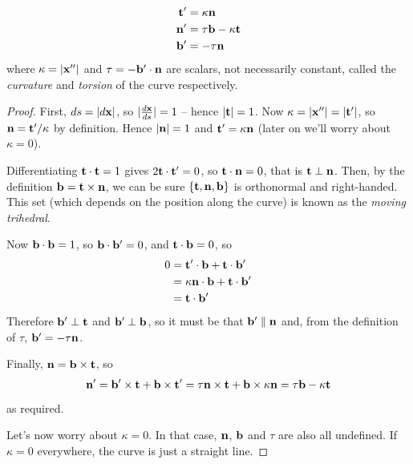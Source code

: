 \documentclass{../template/note}
\begin{document}
    \begin{proposition}
        \begin{align*}
            \V t' &= \kappa \V n \\
            \V n' &= \tau \V b - \kappa \V t \\
            \V b' &= -\tau \V n
        \end{align*}
        where \(\kappa = |\V x''|\) and \(\tau = -\V b' \cdot \V n\) are scalars, not necessarily constant, called the \emph{curvature} and \emph{torsion} of the curve respectively.
    \end{proposition}
    
    \begin{proof}
        First, \(ds = |d \V x|\), so \(|\frac{d \V x}{ds}| = 1\) -- hence \(|\V t| = 1\). Now \(\kappa = |\V x''| = |\V t'|\), so \(\V n = \V t'/\kappa\) by definition. Hence \(|\V n| = 1\) and \(\V t' = \kappa \V n\) (later on we'll worry about \(\kappa = 0\)).

        Differentiating \(\V t \cdot \V t = 1\) gives \(2\V t \cdot \V t' = 0\), so \(\V t \cdot \V n = 0\), that is \(\V t \perp \V n\). Then, by the definition \(\V b = \V t \times \V n\), we can be sure \(\{\V t, \V n, \V b\}\) is orthonormal and right-handed. This set (which depends on the position along the curve) is known as the \emph{moving trihedral}.

        Now \(\V b \cdot \V b = 1\), so \(\V b \cdot \V b' = 0\), and \(\V t \cdot \V b = 0\), so 
        \begin{align*}
            0 &= \V t' \cdot \V b + \V t \cdot \V b' \\
            &= \kappa \V n \cdot \V b + \V t \cdot \V b' \\
            &= \V t \cdot \V b'
        \end{align*}
        Therefore \(\V b' \perp \V t\) and \(\V b' \perp \V b\), so it must be that \(\V b' \parallel \V n\) and, from the definition of \(\tau\), \(\V b' = -\tau \V n\).

        Finally, \(\V n = \V b \times \V t\), so
        \begin{align*}
            \V n' = \V b' \times \V t + \V b \times \V t' = \tau \V n \times \V t + \V b \times \kappa \V n = \tau \V b - \kappa \V t
        \end{align*}
        as required.

        Let's now worry about \(\kappa = 0\). In that case, \(\V n\), \(\V b\) and \(\tau\) are also all undefined. If \(\kappa = 0\) everywhere, the curve is just a straight line.
    \end{proof}
    
\end{document}

